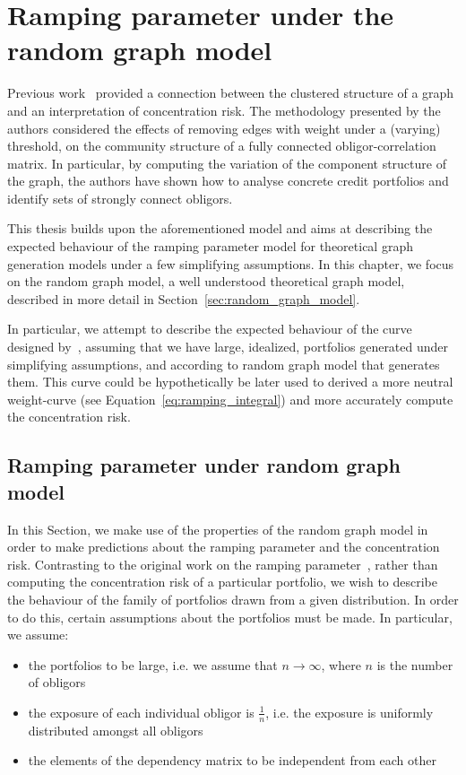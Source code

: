 \chapter{Ramping parameter under the random graph model} %
\label{cha:ramping_parameter_under_the_random_graph_model}

Previous work~\cite{Sindel:2009vd} provided a connection between the clustered structure of a graph and an interpretation of concentration risk.
The methodology presented by the authors considered the effects of removing edges with weight under a (varying) threshold, on the community structure of a fully connected obligor-correlation matrix.
In particular, by computing the variation of the component structure of the graph, the authors have shown how to analyse concrete credit portfolios and identify sets of strongly connect obligors.


This thesis builds upon the aforementioned model and aims at describing the expected behaviour of the ramping parameter model for theoretical graph generation models under a few simplifying assumptions.
In this chapter, we focus on the random graph model, a well understood theoretical graph model, described in more detail in Section~\ref{sec:random_graph_model}.

In particular, we attempt to describe the expected behaviour of the curve designed by~\cite{Sindel:2009vd}, assuming that we have large, idealized, portfolios generated under simplifying assumptions,
and according to random graph model that generates them.
This curve could be hypothetically be later used to derived a more neutral weight-curve (see Equation~\ref{eq:ramping_integral}) and more accurately compute the concentration risk.


\section{Ramping parameter under random graph model} %
\label{sec:ramping_parameter_under_random_graph_model}


In this Section, we make use of the properties of the random graph model in order to make predictions about the ramping parameter and the concentration risk.
Contrasting to the original work on the ramping parameter~\cite{Sindel:2009vd}, rather than computing the concentration risk of a particular portfolio, we wish to describe the behaviour of the family of portfolios drawn from a given distribution.
In order to do this, certain assumptions about the portfolios must be made.
In particular, we assume:
\begin{itemize}
	\item the portfolios to be large, i.e. we assume that $n \rightarrow \infty$, where $n$ is the number of obligors
	\item the exposure of each individual obligor is $\frac{1}{n}$, i.e. the exposure is uniformly distributed amongst all obligors
	\item the elements of the dependency matrix to be independent from each other
\end{itemize}

